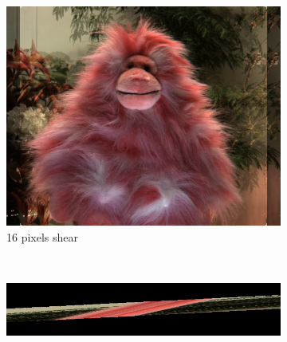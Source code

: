 \documentclass[a4paper]{article}
\begin{document}
\begin{figure}[ht]
\begin{subfigure}[h]{0.48\textwidth}
	  \vspace{2mm}
	  \includegraphics[width=\textwidth]{ShearedInterpolation58_62_shear16}
	  \caption*{16 pixels shear}
	\end{subfigure}
    	~
	\begin{subfigure}[h]{0.48\textwidth}
	  \centering
	  \includegraphics[width=\textwidth]{shear20}
	  

\end{subfigure}
\end{figure}
\end{document}
